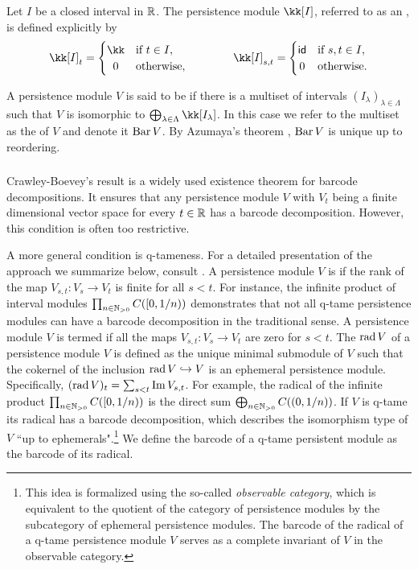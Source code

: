 Let $I$ be a closed interval in $\mathbb{R}$.
The persistence module $\kk[I]$, referred to as an , is defined explicitly by
\[
\kk[I]_t =
\begin{cases}
	\kk & \text{if } t \in I, \\
	\hfil 0 & \text{otherwise},
\end{cases}
\qquad \qquad
\kk[I]_{s, t} =
\begin{cases}
	\id & \text{if } s, t \in I, \\
	\hfil 0 & \text{otherwise}.
\end{cases}
\]

A persistence module $V$ is said to be  if there is a multiset of intervals $(I_\lambda)_{\lambda \in \Lambda}$ such that $V$ is isomorphic to $\bigoplus_{\lambda \in \Lambda} \kk[I_\lambda]$.
In this case we refer to the multiset as the  of $V$ and denote it $\operatorname{Bar} V$.
By Azumaya’s theorem \cite{azumaya1950theorem}, $\operatorname{Bar} V$ is unique up to reordering.

\subsubsection{}

Crawley-Boevey's result \cite{Crawley-Boevey.2015} is a widely used existence theorem for barcode decompositions.
It ensures that any persistence module \(V\) with \(V_t\) being a finite dimensional vector space for every \(t \in \mathbb{R}\) has a barcode decomposition.
However, this condition is often too restrictive.

A more general condition is q-tameness.
For a detailed presentation of the approach we summarize below, consult \cite{Chazal.2016a, Chazal.2016b}.
A persistence module \(V\) is  if the rank of the map \(V_{s,t} \colon V_s \to V_t\) is finite for all \(s < t\).
For instance, the infinite product of interval modules \(\prod_{n \in \mathbb{N}_{> 0}} C([0,1/n))\) demonstrates that not all q-tame persistence modules can have a barcode decomposition in the traditional sense.
A persistence module \(V\) is termed  if all the maps \(V_{s,t} \colon V_s \to V_t\) are zero for \(s < t\).
The  \(\operatorname{rad} V\) of a persistence module \(V\) is defined as the unique minimal submodule of \(V\) such that the cokernel of the inclusion \(\operatorname{rad} V \hookrightarrow V\) is an ephemeral persistence module.
Specifically, \((\operatorname{rad} V)_t = \sum_{s<t} \operatorname{Im} V_{s,t}\).
For example, the radical of the infinite product \(\prod_{n \in \mathbb{N}_{> 0}} C([0, 1/n))\) is the direct sum \(\bigoplus_{n \in \mathbb{N}_{> 0}} C((0,1/n))\).
If \(V\) is q-tame its radical has a barcode decomposition, which describes the isomorphism type of \(V\) ``up to ephemerals".\footnote{
This idea is formalized using the so-called \textit{observable category}, which is equivalent to the quotient of the category of persistence modules by the subcategory of ephemeral persistence modules.
The barcode of the radical of a q-tame persistence module \(V\) serves as a complete invariant of \(V\) in the observable category.}
We define the barcode of a q-tame persistent module as the barcode of its radical.

